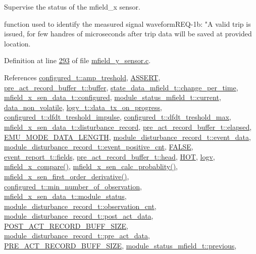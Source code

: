 Supervise the status of the mfield\+\_\+x sensor. 

function used to identify the measured signal waveformR\+E\+Q-\/1b\+: "A valid trip is issued, for few handres of microseconds after trip data will be saved at provided location.

Definition at line \hyperlink{a00052_source_l00293}{293} of file \hyperlink{a00052_source}{mfield\+\_\+y\+\_\+sensor.\+c}.



References \hyperlink{a00021_a4b3bbfb0267daea1432f2603825ade62}{configured\+\_\+t\+::amp\+\_\+treshold}, \hyperlink{a00072_source_l00059}{A\+S\+S\+E\+R\+T}, \hyperlink{a00022_source_l00137}{pre\+\_\+act\+\_\+record\+\_\+buffer\+\_\+t\+::buffer}, \hyperlink{a00019_source_l00102}{state\+\_\+data\+\_\+mfield\+\_\+t\+::change\+\_\+per\+\_\+time}, \hyperlink{a00025_source_l00036}{mfield\+\_\+x\+\_\+sen\+\_\+data\+\_\+t\+::configured}, \hyperlink{a00019_source_l00108}{module\+\_\+status\+\_\+mfield\+\_\+t\+::current}, \hyperlink{a00060_source_l00016}{data\+\_\+non\+\_\+volatile}, \hyperlink{a00021_a6cdefde69642ef511e3252c38be68516}{logv\+\_\+t\+::data\+\_\+tx\+\_\+on\+\_\+progress}, \hyperlink{a00021_source_l00189}{configured\+\_\+t\+::dfdt\+\_\+treshold\+\_\+impulse}, \hyperlink{a00021_source_l00190}{configured\+\_\+t\+::dfdt\+\_\+treshold\+\_\+max}, \hyperlink{a00025_source_l00041}{mfield\+\_\+x\+\_\+sen\+\_\+data\+\_\+t\+::disturbance\+\_\+record}, \hyperlink{a00022_source_l00140}{pre\+\_\+act\+\_\+record\+\_\+buffer\+\_\+t\+::elapsed}, \hyperlink{a00022_source_l00015}{E\+M\+U\+\_\+\+M\+O\+D\+E\+\_\+\+D\+A\+T\+A\+\_\+\+L\+E\+N\+G\+T\+H}, \hyperlink{a00022_source_l00228}{module\+\_\+disturbance\+\_\+record\+\_\+t\+::event\+\_\+data}, \hyperlink{a00022_source_l00182}{module\+\_\+disturbance\+\_\+record\+\_\+t\+::event\+\_\+positive\+\_\+cnt}, \hyperlink{a00040_source_l00086}{F\+A\+L\+S\+E}, \hyperlink{a00021_a5296d090c085b0421fdf5a86e382abea}{event\+\_\+report\+\_\+t\+::fields}, \hyperlink{a00022_source_l00142}{pre\+\_\+act\+\_\+record\+\_\+buffer\+\_\+t\+::head}, \hyperlink{a00021_source_l00153}{H\+O\+T}, \hyperlink{a00038_source_l00036}{logv}, \hyperlink{a00052_source_l00209}{mfield\+\_\+x\+\_\+compare()}, \hyperlink{a00052_source_l00242}{mfield\+\_\+x\+\_\+sen\+\_\+calc\+\_\+probablity()}, \hyperlink{a00052_source_l00229}{mfield\+\_\+x\+\_\+sen\+\_\+first\+\_\+order\+\_\+derivative()}, \hyperlink{a00021_source_l00200}{configured\+\_\+t\+::min\+\_\+number\+\_\+of\+\_\+observation}, \hyperlink{a00025_source_l00045}{mfield\+\_\+x\+\_\+sen\+\_\+data\+\_\+t\+::module\+\_\+status}, \hyperlink{a00022_source_l00180}{module\+\_\+disturbance\+\_\+record\+\_\+t\+::observation\+\_\+cnt}, \hyperlink{a00022_source_l00177}{module\+\_\+disturbance\+\_\+record\+\_\+t\+::post\+\_\+act\+\_\+data}, \hyperlink{a00022_source_l00014}{P\+O\+S\+T\+\_\+\+A\+C\+T\+\_\+\+R\+E\+C\+O\+R\+D\+\_\+\+B\+U\+F\+F\+\_\+\+S\+I\+Z\+E}, \hyperlink{a00022_source_l00176}{module\+\_\+disturbance\+\_\+record\+\_\+t\+::pre\+\_\+act\+\_\+data}, \hyperlink{a00022_source_l00013}{P\+R\+E\+\_\+\+A\+C\+T\+\_\+\+R\+E\+C\+O\+R\+D\+\_\+\+B\+U\+F\+F\+\_\+\+S\+I\+Z\+E}, \hyperlink{a00019_source_l00110}{module\+\_\+status\+\_\+mfield\+\_\+t\+::previous}, 